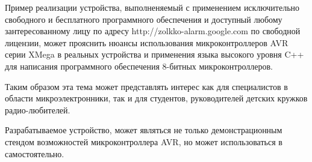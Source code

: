 \begin{par}
Пример реализации устройства, выполненяемый с применением исключительно свободного и бесплатного
программного обеспечения и доступный любому зантересованному лицу по адресу http://zolkko-alarm.google.com
по свободной лицензии, может прояснить нюансы использования микроконтроллеров AVR серии
XMega в реальных устройства и применения языка высокого уровня C++ для написания программного
обеспечения 8-битных микроконтроллеров.
\end{par}

\begin{par}
Таким образом эта тема может представлять интерес как для специалистов в области микроэлектронники,
так и для студентов, руководителей детских кружков радио-любителей.
\end{par}

Разрабатываемое устройство, может являться не только демонстрационным стендом возможностей микроконтроллера AVR,
но может использоваться в самостоятельно.

\newpage{}


